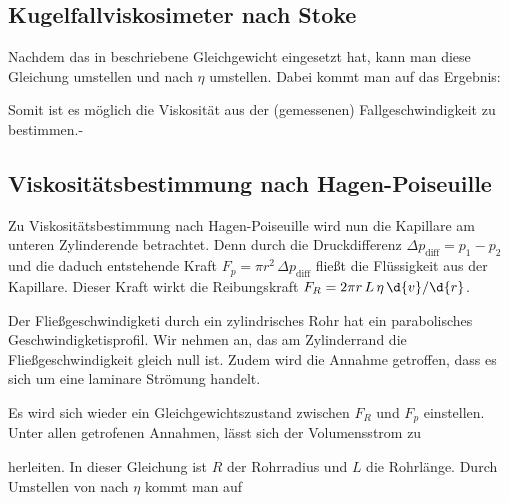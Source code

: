 \subsection{Kugelfallviskosimeter nach Stoke}
\label{ssec:Kugelfallviskosimeter}

Nachdem das in  beschriebene Gleichgewicht eingesetzt hat, kann man diese Gleichung umstellen und nach $\eta$ umstellen. Dabei kommt man auf das Ergebnis:


Somit ist es möglich die Viskosität aus der (gemessenen) Fallgeschwindigkeit zu bestimmen.-

\subsection{Viskositätsbestimmung nach Hagen-Poiseuille}
\label{ssec:HuP}

Zu Viskositätsbestimmung nach Hagen-Poiseuille wird nun die Kapillare am unteren Zylinderende betrachtet. Denn durch die Druckdifferenz $\Delta p_\text{diff} = p_1 - p_2$ und die daduch entstehende Kraft $F_p = \pi r^2\,\Delta p_\text{diff}$ fließt die Flüssigkeit aus der Kapillare. Dieser Kraft wirkt die Reibungskraft $F_R = 2 \pi r \, L \, \eta \, \d{v} / \d{r}$.

Der Fließgeschwindigketi durch ein zylindrisches Rohr hat ein parabolisches Geschwindigketisprofil. Wir nehmen an, das am Zylinderrand die Fließgeschwindigkeit gleich null ist. Zudem wird die Annahme getroffen, dass es sich um eine laminare Strömung handelt. 

Es wird sich wieder ein Gleichgewichtszustand zwischen $F_R$ und $F_p$ einstellen. Unter allen getrofenen Annahmen, lässt sich der Volumensstrom zu


herleiten. In dieser Gleichung ist $R$ der Rohrradius und $L$ die Rohrlänge. Durch Umstellen von  nach $\eta$ kommt man auf




